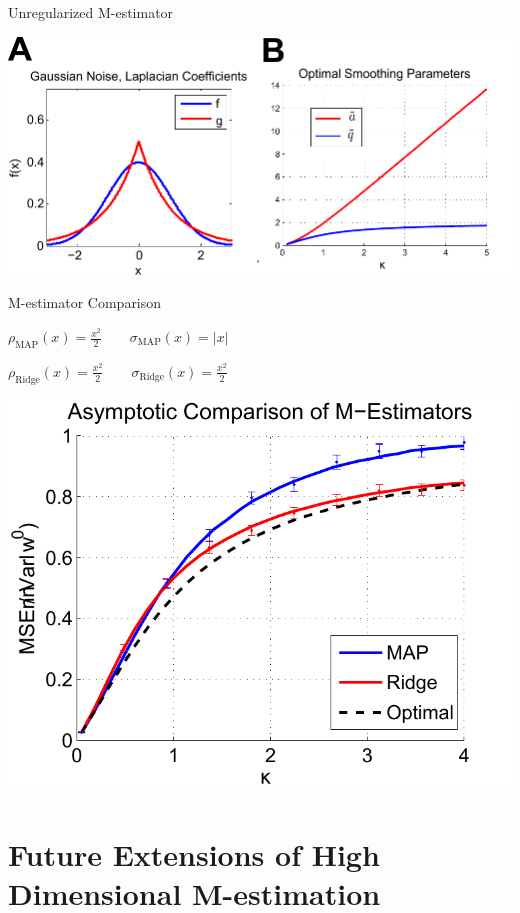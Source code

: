 \documentclass[pdf]{beamer}
\begin{document}
\begin{frame}{Unregularized M-estimator}
        \begin{center}
            \includegraphics[width = .7\linewidth]{regularizedPlots.pdf}
        \end{center}


\end{frame}


\begin{frame}{M-estimator Comparison}
\begin{center}
    $\rho_{\text{MAP}}(x) = \frac{x^2}{2} \quad\quad \sigma_{\text{MAP}}(x) = |x|$

    $ \rho_{\text{Ridge}}(x) = \frac{x^2}{2} \quad\quad \sigma_{\text{Ridge}}(x) = \frac{x^2}{2}$
\end{center}

\vspace{.1in}
        \begin{center}
            \includegraphics[width = .55\linewidth]{CompareM_est_redo.pdf}
        \end{center}
\end{frame}


\section{Future Extensions of High Dimensional M-estimation}
\frame{\sectionpage}
\end{document}
